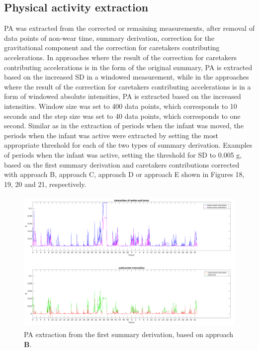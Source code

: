 \documentclass{article}
\begin{document}
{\subsection{Physical activity extraction}
PA was extracted from the corrected or remaining measurements, after removal of data points of non-wear time, summary derivation, correction for the gravitational component and the correction for caretakers contributing accelerations. In approaches where the result of the correction for caretakers contributing accelerations is in the form of the original summary, PA is extracted based on the increased SD in a windowed measurement, while in the approaches where the result of the correction for caretakers contributing accelerations is in a form of windowed absolute intensities, PA is extracted based on the increased intensities. Window size was set to 400 data points, which corresponds to 10 seconds and the step size was set to 40 data points, which corresponds to one second. Similar as in the extraction of periods when the infant was moved, the periods when the infant was active were extracted by setting the most appropriate threshold for each of the two types of summary derivation. Examples of periods when the infant was active, setting the threshold for SD to 0.005 g, based on the first summary derivation and caretakers contributions corrected with approach B, approach C, approach D or approach E shown in Figures 18, 19, 20 and 21, respectively.
\begin{figure}[h]
\includegraphics[width=15cm, height=7cm]{SubtractedIntensitiesPA.png}
\caption{PA extraction from the first summary derivation, based on approach \textbf{B}.}
\end{figure}

}
\end{document}
